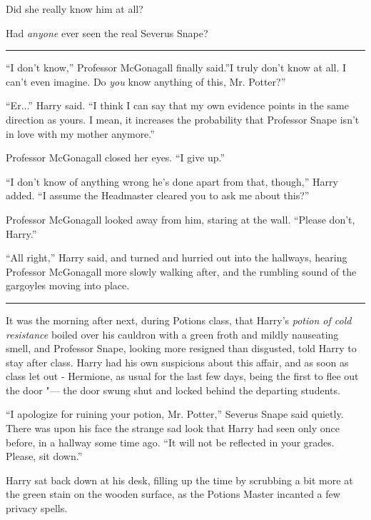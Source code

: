 Did she really know him at all?

Had \emph{anyone} ever seen the real Severus Snape?

\begin{center}\rule{3in}{0.4pt}\end{center}

``I don't know,'' Professor McGonagall finally said.''I truly don't know
at all. I can't even imagine. Do \emph{you} know anything of this, Mr.
Potter?''

``Er...'' Harry said. ``I think I can say that my own evidence
points in the same direction as yours. I mean, it increases the
probability that Professor Snape isn't in love with my mother anymore.''

Professor McGonagall closed her eyes. ``I give up.''

``I don't know of anything wrong he's done apart from that, though,''
Harry added. ``I assume the Headmaster cleared you to ask me about
this?''

Professor McGonagall looked away from him, staring at the wall. ``Please
don't, Harry.''

``All right,'' Harry said, and turned and hurried out into the hallways,
hearing Professor McGonagall more slowly walking after, and the rumbling
sound of the gargoyles moving into place.

\begin{center}\rule{3in}{0.4pt}\end{center}

It was the morning after next, during Potions class, that Harry's
\emph{potion of cold resistance} boiled over his cauldron with a green
froth and mildly nauseating smell, and Professor Snape, looking more
resigned than disgusted, told Harry to stay after class. Harry had his
own suspicions about this affair, and as soon as class let out -
Hermione, as usual for the last few days, being the first to flee out
the door "--- the door swung shut and locked behind the departing students.

``I apologize for ruining your potion, Mr. Potter,'' Severus Snape said
quietly. There was upon his face the strange sad look that Harry had
seen only once before, in a hallway some time ago. ``It will not be
reflected in your grades. Please, sit down.''

Harry sat back down at his desk, filling up the time by scrubbing a bit
more at the green stain on the wooden surface, as the Potions Master
incanted a few privacy spells.

